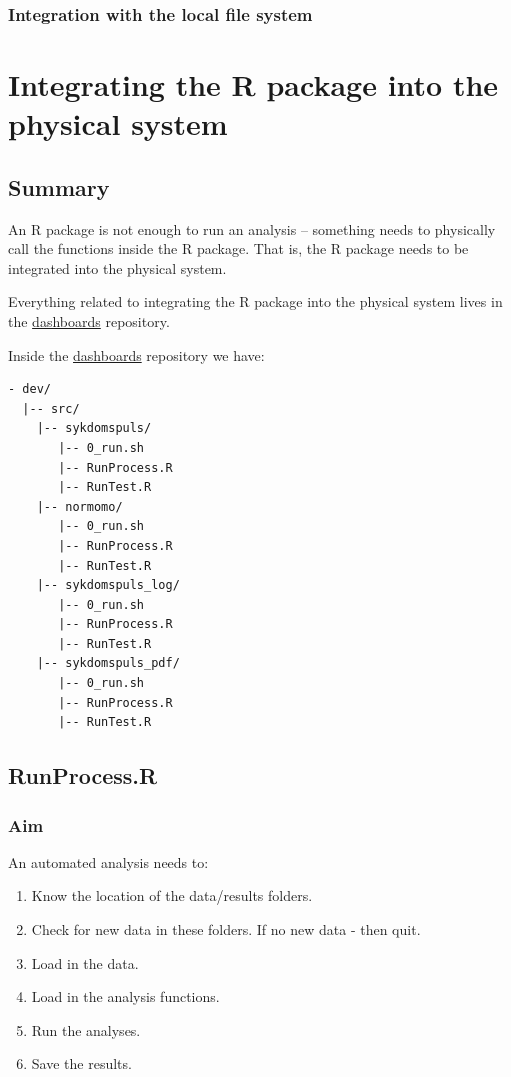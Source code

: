 \documentclass[12pt,]{article}
\providecommand{\tightlist}{%
  \setlength{\itemsep}{0pt}\setlength{\parskip}{0pt}}
\begin{document}
\subsubsection{Integration with the local file
system}\label{integration-with-the-local-file-system}

\section{Integrating the R package into the physical
system}\label{integrating-the-r-package-into-the-physical-system}

\subsection{Summary}\label{summary}

An R package is not enough to run an analysis -- something needs to
physically call the functions inside the R package. That is, the R
package needs to be integrated into the physical system.

Everything related to integrating the R package into the physical system
lives in the
\href{https://github.com/folkehelseinstituttet/dashboards/}{dashboards}
repository.

Inside the
\href{https://github.com/folkehelseinstituttet/dashboards/}{dashboards}
repository we have:

\begin{verbatim}
- dev/
  |-- src/
    |-- sykdomspuls/
       |-- 0_run.sh
       |-- RunProcess.R
       |-- RunTest.R
    |-- normomo/
       |-- 0_run.sh
       |-- RunProcess.R
       |-- RunTest.R
    |-- sykdomspuls_log/
       |-- 0_run.sh
       |-- RunProcess.R
       |-- RunTest.R
    |-- sykdomspuls_pdf/
       |-- 0_run.sh
       |-- RunProcess.R
       |-- RunTest.R
\end{verbatim}

\subsection{RunProcess.R}\label{runprocess.r}

\subsubsection{Aim}\label{aim}

An automated analysis needs to:

\begin{enumerate}
\def\labelenumi{\arabic{enumi}.}
\tightlist
\item
  Know the location of the data/results folders.
\item
  Check for new data in these folders. If no new data - then quit.
\item
  Load in the data.
\item
  Load in the analysis functions.
\item
  Run the analyses.
\item
  Save the results.
\end{enumerate}
\end{document}

